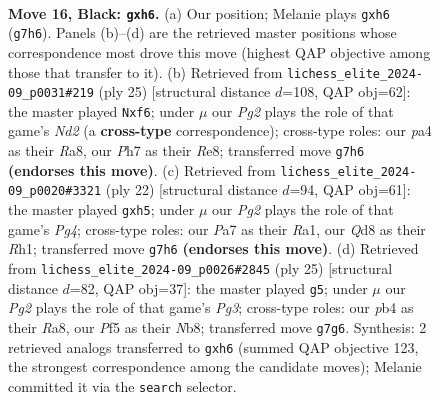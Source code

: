 \documentclass[11pt]{article}
\begin{document}
\clearpage

\begin{figure}[p]\centering
\begin{subfigure}{0.46\textwidth}\centering
\resizebox{\linewidth}{!}{%
\newchessgame
\chessboard[
  setfen={rnbq2k1/pp4pp/2p1r2B/3p1p2/PP1P3b/2N1PP1P/2QKN1P1/R4B1R b - - 0 16},
  showmover=false,
  pgfstyle=straightmove, color=movearrow, markmove={g7-h6}
]}
\caption{}
\end{subfigure}\hfill
\begin{subfigure}{0.46\textwidth}\centering
\resizebox{\linewidth}{!}{%
\newchessgame
\chessboard[
  setfen={r1b1rk2/pp1n1pp1/1q1b1B2/2pp4/3P3P/P2BP3/1PQ1NPP1/RN2K2R b KQ - 0 13},
  showmover=false,
  pgfstyle=straightmove, color=movearrow, markmove={d7-f6}
]}
\caption{}
\end{subfigure}
\\[4pt]
\begin{subfigure}{0.46\textwidth}\centering
\resizebox{\linewidth}{!}{%
\newchessgame
\chessboard[
  setfen={rn1qk2r/p1pn1ppp/1p1b4/5p1b/2BP2P1/1QN1P2P/PP3P2/R1B1K2R w KQkq - 0 12},
  showmover=false,
  pgfstyle=straightmove, color=movearrow, markmove={g4-h5}
]}
\caption{}
\end{subfigure}\hfill
\begin{subfigure}{0.46\textwidth}\centering
\resizebox{\linewidth}{!}{%
\newchessgame
\chessboard[
  setfen={rnbqr1k1/5pbp/2p2pp1/1p5P/p2P1N2/P3P3/BP3PP1/RN1QK2R b KQ - 0 13},
  showmover=false,
  pgfstyle=straightmove, color=movearrow, markmove={g6-g5}
]}
\caption{}
\end{subfigure}
\caption{\textbf{Move 16, Black: \texttt{gxh6}.} (a) Our position; Melanie plays \texttt{gxh6} (\texttt{g7h6}). Panels (b)--(d) are the retrieved master positions whose correspondence most drove this move (highest QAP objective among those that transfer to it). (b) Retrieved from \texttt{lichess\_elite\_2024-09\_p0031\#219} (ply 25) [structural distance $d$=108, QAP obj=62]: the master played \texttt{Nxf6}; under $\mu$ our \emph{Pg2} plays the role of that game's \emph{Nd2} (a \textbf{cross-type} correspondence); cross-type roles: our \emph{p}a4 as their \emph{R}a8, our \emph{P}h7 as their \emph{R}e8; transferred move \texttt{g7h6} \textbf{(endorses this move)}. (c) Retrieved from \texttt{lichess\_elite\_2024-09\_p0020\#3321} (ply 22) [structural distance $d$=94, QAP obj=61]: the master played \texttt{gxh5}; under $\mu$ our \emph{Pg2} plays the role of that game's \emph{Pg4}; cross-type roles: our \emph{P}a7 as their \emph{R}a1, our \emph{Q}d8 as their \emph{R}h1; transferred move \texttt{g7h6} \textbf{(endorses this move)}. (d) Retrieved from \texttt{lichess\_elite\_2024-09\_p0026\#2845} (ply 25) [structural distance $d$=82, QAP obj=37]: the master played \texttt{g5}; under $\mu$ our \emph{Pg2} plays the role of that game's \emph{Pg3}; cross-type roles: our \emph{p}b4 as their \emph{R}a8, our \emph{P}f5 as their \emph{N}b8; transferred move \texttt{g7g6}. Synthesis: 2 retrieved analogs transferred to \texttt{gxh6} (summed QAP objective 123, the strongest correspondence among the candidate moves); Melanie committed it via the \texttt{search} selector.}
\label{fig:thought-m31}
\end{figure}
\end{document}

